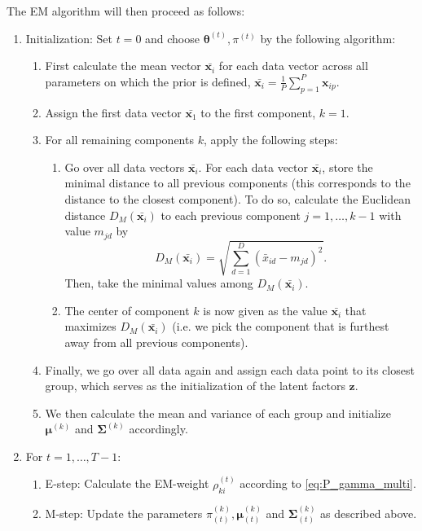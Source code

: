 \documentclass[a4paper,11pt]{article}
\def\x{\boldsymbol{x}}
\def\z{\boldsymbol{z}}
\def\bmu{\boldsymbol{\mu}}
\def\btheta{\boldsymbol{\theta}}
\def\bSigma{\boldsymbol{\Sigma}}
\begin{document}
The EM algorithm will then proceed as follows:
\begin{enumerate}
   \item Initialization: Set $t=0$ and choose $\btheta^{(t)}, \pi^{(t)}$ by the following algorithm:
    \begin{enumerate}
    \item First calculate the mean vector $\bar{\x_i}$ for each data vector across all parameters on which the prior is defined, $\bar{\x_i} = \frac{1}{P}\sum_{p=1}^P \x_{ip}$.
    \item Assign the first data vector $\bar{\x_1}$ to the first component, $k=1$.
    \item For all remaining components $k$, apply the following steps:
    \begin{enumerate}
     \item Go over all data vectors $\bar{\x_i}$. For each data vector $\bar{\x_i}$, store the minimal distance to all previous components (this corresponds to the distance to the closest component). To do so, calculate the Euclidean distance $D_M(\bar{\x_i})$ to each previous component $j=1, \ldots, k-1$ with value $m_{jd}$ by
    \begin{equation*}
    D_M(\bar{\x_i}) = \sqrt{\sum_{d=1}^D (\bar{x}_{id} - m_{jd})^2}.
    \end{equation*}
     Then, take the minimal values among $D_M(\bar{\x_i})$.
     \item The center of component $k$ is now given as the value $\bar{\x_i}$ that maximizes $D_M(\bar{\x_i})$ (i.e. we pick the component that is furthest away from all previous components).
    \end{enumerate}
    \item Finally, we go over all data again and assign each data point to its closest group, which serves as the initialization of the latent factors $\z$.
    \item We then calculate the mean and variance of each group and initialize $\bmu^{(k)}$ and $\bSigma^{(k)}$ accordingly.
    \end{enumerate}
   \item For $t=1, \ldots, T-1$:
    \begin{enumerate}
        \item E-step: Calculate the EM-weight $\rho_{ki}^{(t)}$ according to \eqref{eq:P_gamma_multi}.

        \item M-step: Update the parameters $\pi^{(k)}_{(t)}, \bmu^{(k)}_{(t)}$ and $\bSigma^{(k)}_{(t)}$ as described above.
    \end{enumerate}
\end{enumerate}
\end{document}
